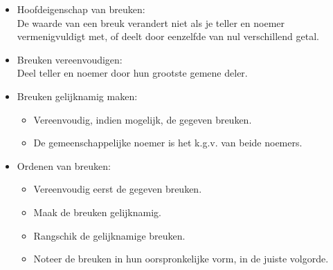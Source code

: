 \documentclass{bis}
\begin{document}
\begin{onthoud}
\begin{itemize}
  \item Hoofdeigenschap van breuken:\\
  De waarde van een breuk verandert niet als je teller en noemer vermenigvuldigt met, of deelt door eenzelfde van nul verschillend getal.
  \item Breuken vereenvoudigen:\\
  Deel teller en noemer door hun grootste gemene deler.
  \item Breuken gelijknamig maken:
  \begin{itemize}
    \item Vereenvoudig, indien mogelijk, de gegeven breuken.
    \item De gemeenschappelijke noemer is het k.g.v. van beide noemers.
  \end{itemize}
  \item Ordenen van breuken:
  \begin{itemize}
    \item Vereenvoudig eerst de gegeven breuken.
    \item Maak de breuken gelijknamig.
    \item Rangschik de gelijknamige breuken.
    \item Noteer de breuken in hun oorspronkelijke vorm, in de juiste volgorde.
  \end{itemize}
\end{itemize}
\end{onthoud}

\oplossingen
\end{document}
